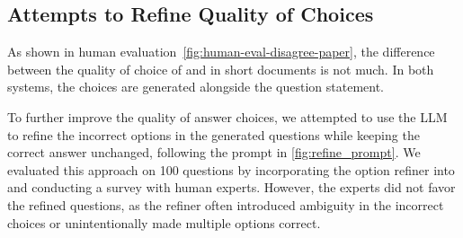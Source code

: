 \subsection{Attempts to Refine Quality of Choices}
\label{appendix:choice-refine}
As shown in human evaluation~\autoref{fig:human-eval-disagree-paper}, the difference between the quality of choice of \Baseline and \TheSystem in short documents is not much. In both systems, the choices are generated alongside the question statement.

To further improve the quality of answer choices, we attempted to use the LLM to refine the incorrect options in the generated questions while keeping the correct answer unchanged, following the prompt in \autoref{fig:refine_prompt}. We evaluated this approach on 100 questions by incorporating the option refiner into \name and conducting a survey with human experts. However, the experts did not favor the refined questions, as the refiner often introduced ambiguity in the incorrect choices or unintentionally made multiple options correct.


